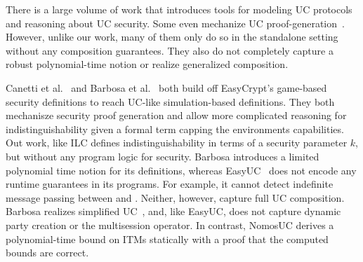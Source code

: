 There is a large volume of work that introduces tools for modeling UC protocols and reasoning about UC security.
Some even mechanize UC proof-generation~\cite{certicrypt, easycrypt, cryptoverif, cryptol, fstar}.
However, unlike our work, many of them only do so in the standalone setting without any composition guarantees.
They also do not completely capture a robust polynomial-time notion or realize generalized composition. 

Canetti et al.~\cite{easyuc} and Barbosa et al.~\cite{barbosa} both build off EasyCrypt's game-based security definitions to reach UC-like simulation-based definitions.
They both mechanisze security proof generation and allow more complicated reasoning for indistinguishability given a formal term capping the environments capabilities. Out work, like ILC defines indistinguishability in terms of a security parameter $k$, but without any program logic for security. 
Barbosa introduces a limited polynomial time notion for its definitions, whereas EasyUC~\cite{easyuc} does not encode any runtime guarantees in its programs. 
For example, it cannot detect indefinite message passing between \A and \F. Neither, however, capture full UC composition.
Barbosa realizes simplified UC~\cite{suc}, and, like EasyUC, does not capture dynamic party creation or the multisession operator.
In contrast, NomosUC derives a polynomial-time bound on ITMs statically with a proof that the computed bounds are correct.

